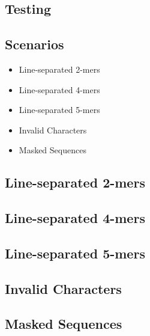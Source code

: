 \documentclass[12pt,notitlepage]{article}
\begin{document}
\begin{s5presentation}
\begin{ifhtml}
    \begin{s5slide}
      \section{Testing}
      \subsection{Scenarios}
      \begin{itemize}
      \item Line-separated 2-mers
      \item Line-separated 4-mers
      \item Line-separated 5-mers
      \item Invalid Characters
      \item Masked Sequences
      \end{itemize}
    \end{s5slide}

    \begin{s5slide}
      \section{Line-separated 2-mers}
    \end{s5slide}

    \begin{s5slide}
      \section{Line-separated 4-mers}
    \end{s5slide}

    \begin{s5slide}
      \section{Line-separated 5-mers}
    \end{s5slide}

    \begin{s5slide}
      \section{Invalid Characters}
    \end{s5slide}

    \begin{s5slide}
      \section{Masked Sequences}
    \end{s5slide}


\end{ifhtml}
\end{s5presentation}
\end{document}
